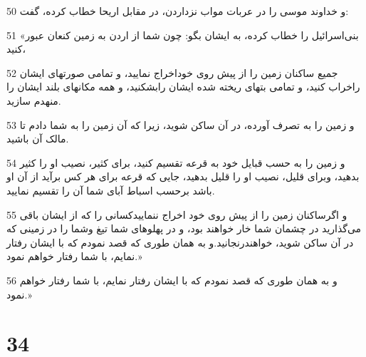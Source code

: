 \par 50 و خداوند موسی را در عربات مواب نزداردن، در مقابل اریحا خطاب کرده، گفت:
\par 51 «بنی‌اسرائیل را خطاب کرده، به ایشان بگو: چون شما از اردن به زمین کنعان عبور کنید،
\par 52 جمیع ساکنان زمین را از پیش روی خوداخراج نمایید، و تمامی صورتهای ایشان راخراب کنید، و تمامی بتهای ریخته شده ایشان رابشکنید، و همه مکانهای بلند ایشان را منهدم سازید.
\par 53 و زمین را به تصرف آورده، در آن ساکن شوید، زیرا که آن زمین را به شما دادم تا مالک آن باشید.
\par 54 و زمین را به حسب قبایل خود به قرعه تقسیم کنید، برای کثیر، نصیب او را کثیر بدهید، وبرای قلیل، نصیب او را قلیل بدهید، جایی که قرعه برای هر کس برآید از آن او باشد برحسب اسباط آبای شما آن را تقسیم نمایید.
\par 55 و اگرساکنان زمین را از پیش روی خود اخراج ننماییدکسانی را که از ایشان باقی می‌گذارید در چشمان شما خار خواهند بود، و در پهلوهای شما تیغ وشما را در زمینی که در آن ساکن شوید، خواهندرنجانید.و به همان طوری که قصد نمودم که با ایشان رفتار نمایم، با شما رفتار خواهم نمود.»
\par 56 و به همان طوری که قصد نمودم که با ایشان رفتار نمایم، با شما رفتار خواهم نمود.»
 
\chapter{34}

